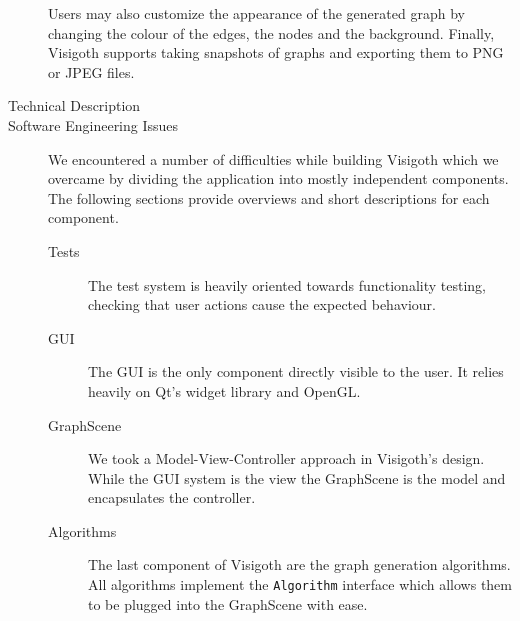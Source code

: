 \documentclass[a4paper,11pt]{article}
\newcommand{\code}[1]{\texttt{#1}}
\begin{document}
\begin{description}
  Users may also customize the appearance of the generated graph by
  changing the colour of the edges, the nodes and the background.
  Finally, Visigoth supports taking snapshots of graphs and exporting
  them to PNG or JPEG files.

\item[Technical Description]

\item[Software Engineering Issues]

  We encountered a number of difficulties while building Visigoth
  which we overcame by dividing the application into mostly
  independent components. The following sections provide overviews
  and short descriptions for each component.

  \begin{description}
  \item[Tests] The test system is heavily oriented towards
    functionality testing, checking that user actions cause the
    expected behaviour.

  \item[GUI] The GUI is the only component directly visible to the
    user. It relies heavily on Qt's widget library and OpenGL.

  \item[GraphScene] We took a Model-View-Controller approach in
    Visigoth's design. While the GUI system is the view the
    GraphScene is the model and encapsulates the controller.

  \item[Algorithms] The last component of Visigoth are the graph
    generation algorithms. All algorithms implement the
    \code{Algorithm} interface which allows them to be plugged into
    the GraphScene with ease.
  \end{description}


\end{description}
\end{document}
